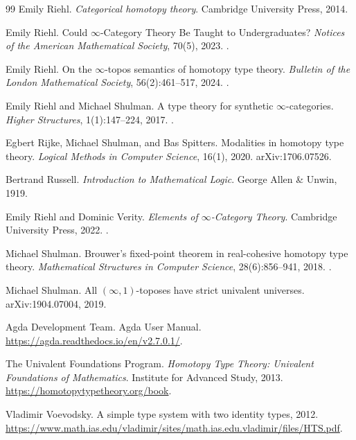 \documentclass[12pt]{article}
\begin{document}
\begin{thebibliography}{99}
Emily Riehl.
\newblock \emph{Categorical homotopy theory}.
\newblock Cambridge University Press, 2014.

Emily Riehl.
\newblock Could $\infty$-Category Theory Be Taught to Undergraduates?
\newblock \emph{Notices of the American Mathematical Society}, 70(5), 2023.
\newblock {}.

Emily Riehl.
\newblock On the $\infty$-topos semantics of homotopy type theory.
\newblock \emph{Bulletin of the London Mathematical Society}, 56(2):461--517, 2024.
\newblock {}.

Emily Riehl and Michael Shulman.
\newblock A type theory for synthetic $\infty$-categories.
\newblock \emph{Higher Structures}, 1(1):147--224, 2017.
\newblock {}.

Egbert Rijke, Michael Shulman, and Bas Spitters.
\newblock Modalities in homotopy type theory.
\newblock \emph{Logical Methods in Computer Science}, 16(1), 2020.
\newblock arXiv:1706.07526.

Bertrand Russell.
\newblock \emph{Introduction to Mathematical Logic}.
\newblock George Allen \& Unwin, 1919.

Emily Riehl and Dominic Verity.
\newblock \emph{Elements of $\infty$-Category Theory}.
\newblock Cambridge University Press, 2022.
\newblock {}.

Michael Shulman.
\newblock Brouwer's fixed-point theorem in real-cohesive homotopy type theory.
\newblock \emph{Mathematical Structures in Computer Science}, 28(6):856--941, 2018.
\newblock {}.

Michael Shulman.
\newblock All $(\infty,1)$-toposes have strict univalent universes.
\newblock arXiv:1904.07004, 2019.

Agda Development Team.
\newblock Agda User Manual.
\newblock \url{https://agda.readthedocs.io/en/v2.7.0.1/}.

The Univalent Foundations Program.
\newblock \emph{Homotopy Type Theory: Univalent Foundations of Mathematics}.
\newblock Institute for Advanced Study, 2013.
\newblock \url{https://homotopytypetheory.org/book}.

Vladimir Voevodsky.
\newblock A simple type system with two identity types, 2012.
\newblock \url{https://www.math.ias.edu/vladimir/sites/math.ias.edu.vladimir/files/HTS.pdf}.


\end{thebibliography}
\end{document}

